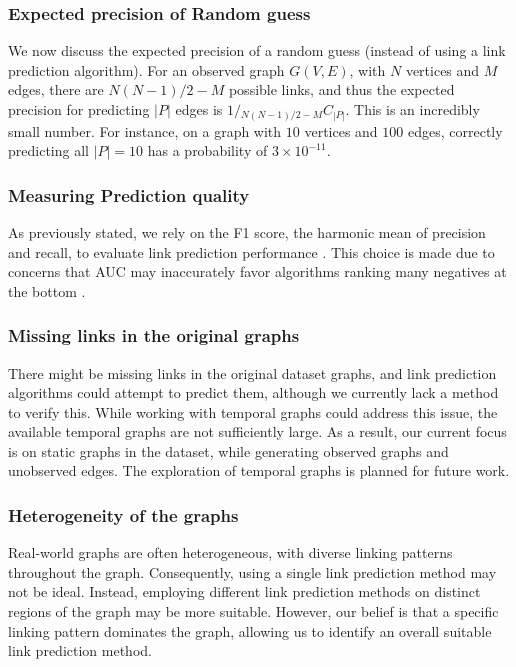 \subsubsection{Expected precision of Random guess}

We now discuss the expected precision of a random guess (instead of using a link prediction algorithm). For an observed graph $G(V, E)$, with $N$ vertices and $M$ edges, there are $N(N-1)/2 - M$ possible links, and thus the expected precision for predicting $|P|$ edges is $1 / {}_{{N(N-1)/2 - M}} C_{|P|}$. This is an incredibly small number. For instance, on a graph with $10$ vertices and $100$ edges, correctly predicting all $|P| = 10$ has a probability of $3\times10^{-11}$.


\subsubsection{Measuring Prediction quality}

As previously stated, we rely on the F1 score, the harmonic mean of precision and recall, to evaluate link prediction performance \cite{lu2015toward}. This choice is made due to concerns that AUC may inaccurately favor algorithms ranking many negatives at the bottom \cite{zhou2021progresses, yang2015evaluating, lichtnwalter2012link}.


\subsubsection{Missing links in the original graphs}

There might be missing links in the original dataset graphs, and link prediction algorithms could attempt to predict them, although we currently lack a method to verify this. While working with temporal graphs could address this issue, the available temporal graphs are not sufficiently large. As a result, our current focus is on static graphs in the dataset, while generating observed graphs and unobserved edges. The exploration of temporal graphs is planned for future work.


\subsubsection{Heterogeneity of the graphs}

Real-world graphs are often heterogeneous, with diverse linking patterns throughout the graph. Consequently, using a single link prediction method may not be ideal. Instead, employing different link prediction methods on distinct regions of the graph may be more suitable. However, our belief is that a specific linking pattern dominates the graph, allowing us to identify an overall suitable link prediction method.




